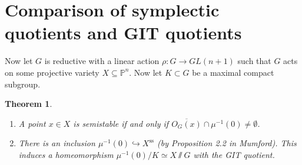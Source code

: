 \documentclass[leqno, openany]{memoir}
\newtheorem{thm}{Theorem}[section]
\theoremstyle{definition}
\theoremstyle{remark}
\theoremstyle{plain}
\theoremstyle{definition}
\theoremstyle{remark}
\renewcommand{\P}{\mathbb{P}}
\newcommand{\mr}[1]{\mathrm{#1}}
\newcommand{\ol}[1]{\overline{#1}}
\begin{document}
\section{Comparison of symplectic quotients and GIT quotients}%
\label{sec:comparison_of_symplectic_quotients_and_git_quotients}

Now let $G$ is reductive with a linear action $\rho \colon G \to GL(n+1)$ such that $G$ acts on some projective variety $X \subseteq \P^n$. Now let $K \subset G$ be a maximal compact subgroup. 

\begin{thm}
    \begin{enumerate}
        \item A point $x \in X$ is semistable if and only if $\ol{O_G(x)} \cap \mu^{-1}(0) \neq \emptyset$.
        \item There is an inclusion $\mu^{-1}(0) \hookrightarrow X^{\mr{ss}}$ (by Proposition 2.2 in Mumford). This induces a homeomorphism $\mu^{-1}(0)/K \simeq X \sslash G$ with the GIT quotient.
    \end{enumerate}
\end{thm}
\end{document}
